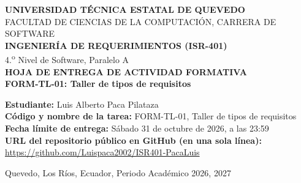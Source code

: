 \documentclass[12pt,a4paper]{article}
\begin{document}
\begin{center}
    {\Large \textbf{UNIVERSIDAD TÉCNICA ESTATAL DE QUEVEDO}}\\[0.5em]
    {\large FACULTAD DE CIENCIAS DE LA COMPUTACIÓN, CARRERA DE SOFTWARE}\\[1.5em]
    
    {\large \textbf{INGENIERÍA DE REQUERIMIENTOS (ISR-401)}}\\[0.5em]
    {\normalsize 4.\textsuperscript{o} Nivel de Software, Paralelo A}\\[2.5em]
    
    {\Large \textbf{HOJA DE ENTREGA DE ACTIVIDAD FORMATIVA}}\\[0.8em]
    {\large \textbf{FORM-TL-01: Taller de tipos de requisitos}}\\[3em]
\end{center}

\vspace{1cm}

\noindent \textbf{Estudiante:} Luis Alberto Paca Pilataza\\[1.2em]
\noindent \textbf{Código y nombre de la tarea:} FORM-TL-01, Taller de tipos de requisitos\\[1.2em]
\noindent \textbf{Fecha límite de entrega:} Sábado 31 de octubre de 2026, a las 23:59\\[2em]
\noindent \textbf{URL del repositorio público en GitHub (en una sola línea):}\\
\url{https://github.com/Luispaca2002/ISR401-PacaLuis}

\vfill

\begin{center}
    \footnotesize Quevedo, Los Ríos, Ecuador, Periodo Académico 2026, 2027
\end{center}
\end{document}
